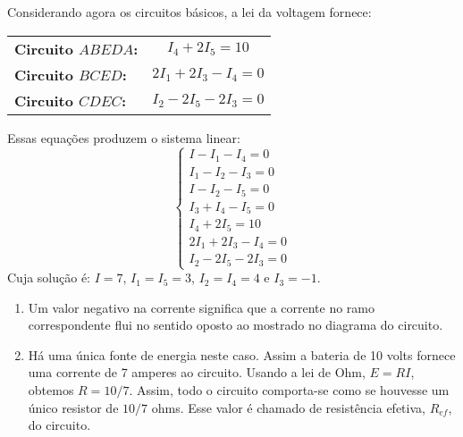 \begin{exemplos}
\begin{solucao}
\begin{enumerate}
            Considerando agora os circuitos básicos, a lei da voltagem fornece:
            \begin{center}
                \begin{tabular}{lc}
                    \textbf{Circuito $ABEDA$:} & $I_4 + 2I_5 = 10$\\
                    \textbf{Circuito $BCED$:} & $2I_1 + 2I_3 - I_4 = 0$\\
                    \textbf{Circuito $CDEC$:} & $I_2 - 2I_5 - 2I_3 = 0$
                \end{tabular}
            \end{center}
            Essas equações produzem o sistema linear:
            \[
                \begin{cases}
                    I - I_1 - I_4 = 0\\
                    I_1 - I_2 - I_3 = 0\\
                    I - I_2 - I_5 = 0\\
                    I_3 + I_4 - I_5 = 0\\
                    I_4 + 2I_5 = 10\\
                    2I_1 + 2I_3 - I_4 = 0\\
                    I_2 - 2I_5 - 2I_3 = 0
                \end{cases}
            \]
            Cuja solução é: $I = 7$, $I_1 = I_5 = 3$, $I_2 = I_4 = 4$ e $I_3 = -1$.
        \end{enumerate}
    \end{solucao}
\end{exemplos}


\begin{observacoes}
    \begin{enumerate}
        \item Um valor negativo na corrente significa que a corrente no ramo correspondente flui no sentido oposto ao mostrado no diagrama do circuito.

        \item Há uma única fonte de energia neste caso. Assim a bateria de 10 volts fornece uma corrente de 7 amperes ao circuito. Usando a lei de Ohm, $E = RI$, obtemos $R = 10/7$. Assim, todo o circuito comporta-se como se houvesse um único resistor de $10/7$ ohms. Esse valor é chamado de \textrm{resistência efetiva}, $R_{ef}$, do circuito.
    \end{enumerate}
\end{observacoes}
